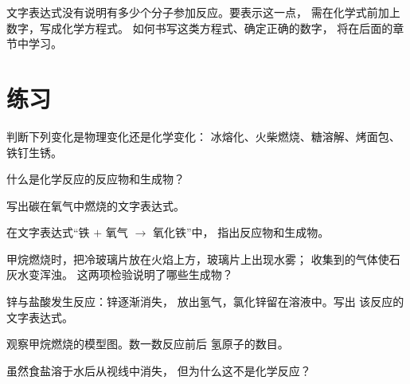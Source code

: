 \begin{remark}[分子的计数]\label{rem:g7:chemical-reactions:counting}
文字表达式没有说明有多少个分子参加反应。要表示这一点，
需在化学式前加上数字，写成化学方程式。
如何书写这类方程式、确定正确的数字，
将在后面的章节中学习。
\end{remark}

\section{练习}

\begin{exercise}[$\star$]\label{exo:g7:chemical-reactions:1}
判断下列变化是物理变化还是化学变化：
冰熔化、火柴燃烧、糖溶解、烤面包、铁钉生锈。
\end{exercise}

\begin{exercise}[$\star$]\label{exo:g7:chemical-reactions:2}
什么是化学反应的反应物和生成物？
\end{exercise}

\begin{exercise}[$\star$]\label{exo:g7:chemical-reactions:3}
写出碳在氧气中燃烧的文字表达式。
\end{exercise}

\begin{exercise}[$\star$]\label{exo:g7:chemical-reactions:4}
在文字表达式“铁 $+$ 氧气 $\longrightarrow$ 氧化铁”中，
指出反应物和生成物。
\end{exercise}

\begin{exercise}[$\star\star$]\label{exo:g7:chemical-reactions:5}
甲烷燃烧时，把冷玻璃片放在火焰上方，玻璃片上出现水雾；
收集到的气体使石灰水变浑浊。
这两项检验说明了哪些生成物？
\end{exercise}

\begin{exercise}[$\star\star$]\label{exo:g7:chemical-reactions:6}
锌与盐酸发生反应：锌逐渐消失，
放出氢气，氯化锌留在溶液中。写出
该反应的文字表达式。
\end{exercise}

\begin{exercise}[$\star\star$]\label{exo:g7:chemical-reactions:7}
观察甲烷燃烧的模型图。数一数反应前后
氢原子的数目。
\end{exercise}

\begin{exercise}[$\star\star$]\label{exo:g7:chemical-reactions:8}
虽然食盐溶于水后从视线中消失，
但为什么这不是化学反应？
\end{exercise}

